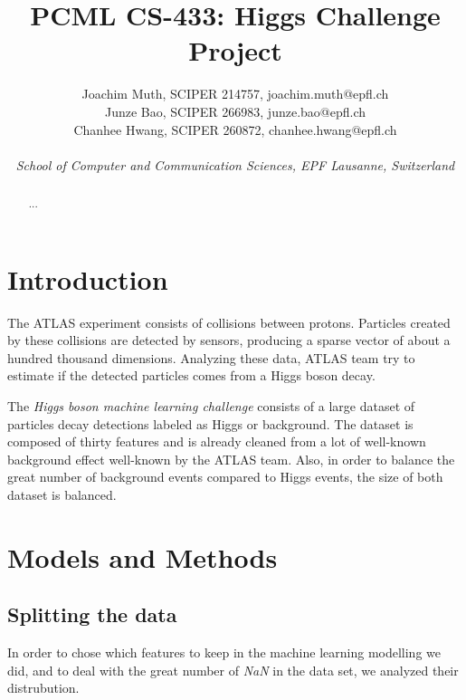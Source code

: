 \documentclass[10pt,conference,compsocconf]{IEEEtran}
\begin{document}
\title{PCML CS-433: Higgs Challenge Project}

\author{
  Joachim Muth, SCIPER 214757, joachim.muth@epfl.ch\\
  Junze Bao, SCIPER 266983, junze.bao@epfl.ch\\
  Chanhee Hwang, SCIPER 260872, chanhee.hwang@epfl.ch\\ \\
  \textit{School of Computer and Communication Sciences, EPF Lausanne, Switzerland}
}

\maketitle

\begin{abstract}
...
\end{abstract}

\section{Introduction}
The ATLAS experiment consists of collisions between protons. Particles created by these collisions are detected by sensors, producing a sparse vector of about a hundred thousand dimensions. Analyzing these data, ATLAS team try to estimate if the detected particles comes from a Higgs boson decay.

The \emph{Higgs boson machine learning challenge} consists of a large dataset of particles decay detections labeled as Higgs or background. The dataset is composed of thirty features and is already cleaned from a lot of well-known background effect well-known by the ATLAS team. Also, in order to balance the great number of background events compared to Higgs events, the size of both dataset is balanced.~\cite{higgsChallenge}

\section{Models and Methods}

\subsection{Splitting the data}
In order to chose which features to keep in the machine learning modelling we did, and to deal with the great number of \emph{NaN} in the data set, we analyzed their distrubution. 
\end{document}
